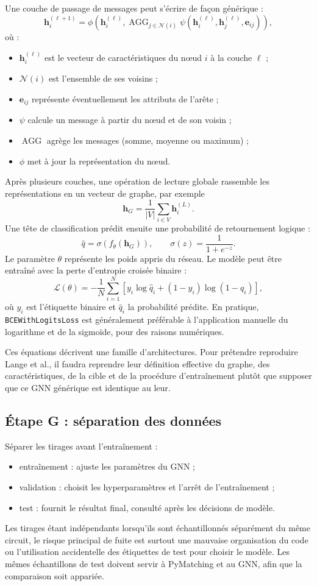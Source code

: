 \documentclass[11pt,a4paper]{article}
\begin{document}
Une couche de passage de messages peut s'écrire de façon générique :
\[
 \mathbf h_i^{(\ell+1)}
 =\phi\!\left(
 \mathbf h_i^{(\ell)},
 \operatorname{AGG}_{j\in\mathcal N(i)}
 \psi(\mathbf h_i^{(\ell)},\mathbf h_j^{(\ell)},\mathbf e_{ij})
 \right),
\]
où :
\begin{itemize}
 \item $\mathbf h_i^{(\ell)}$ est le vecteur de caractéristiques du nœud $i$
 à la couche $\ell$ ;
 \item $\mathcal N(i)$ est l'ensemble de ses voisins ;
 \item $\mathbf e_{ij}$ représente éventuellement les attributs de l'arête ;
 \item $\psi$ calcule un message à partir du nœud et de son voisin ;
 \item $\operatorname{AGG}$ agrège les messages (somme, moyenne ou maximum) ;
 \item $\phi$ met à jour la représentation du nœud.
\end{itemize}
Après plusieurs couches, une opération de lecture globale rassemble les
représentations en un vecteur de graphe, par exemple
\[
 \mathbf h_G=\frac{1}{|V|}\sum_{i\in V}\mathbf h_i^{(L)}.
\]
Une tête de classification prédit ensuite une probabilité de retournement
logique :
\[
 \hat q=\sigma(f_\theta(\mathbf h_G)),\qquad
 \sigma(z)=\frac{1}{1+e^{-z}}.
\]
Le paramètre $\theta$ représente les poids appris du réseau. Le modèle peut
être entraîné avec la perte d'entropie croisée binaire :
\[
 \mathcal L(\theta)=-\frac1N\sum_{i=1}^{N}
 \left[y_i\log\hat q_i+(1-y_i)\log(1-\hat q_i)\right],
\]
où $y_i$ est l'étiquette binaire et $\hat q_i$ la probabilité prédite.
En pratique, \texttt{BCEWithLogitsLoss} est généralement préférable à
l'application manuelle du logarithme et de la sigmoïde, pour des raisons
numériques.

Ces équations décrivent une famille d'architectures. Pour prétendre
reproduire Lange et al., il faudra reprendre leur définition effective du
graphe, des caractéristiques, de la cible et de la procédure d'entraînement
plutôt que supposer que ce GNN générique est identique au leur.

\subsection{Étape G : séparation des données}

Séparer les tirages avant l'entraînement :
\begin{itemize}
 \item entraînement : ajuste les paramètres du GNN ;
 \item validation : choisit les hyperparamètres et l'arrêt de l'entraînement ;
 \item test : fournit le résultat final, consulté après les décisions de modèle.
\end{itemize}
Les tirages étant indépendants lorsqu'ils sont échantillonnés séparément du
même circuit, le risque principal de fuite est surtout une mauvaise
organisation du code ou l'utilisation accidentelle des étiquettes de test
pour choisir le modèle. Les mêmes échantillons de test doivent servir à
PyMatching et au GNN, afin que la comparaison soit appariée.
\end{document}
